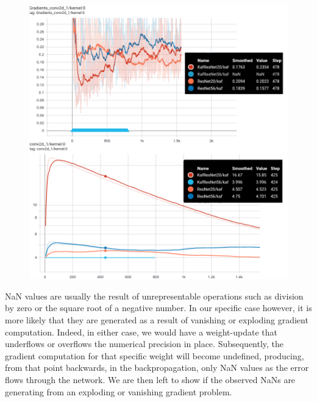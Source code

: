 \documentclass[LaM,binding=0.6cm]{./packages/sapthesis/sapthesis}
\begin{document}
        \begin{figure}[h!]
            \centering
            \includegraphics[scale=0.32]{conv1.png}
            \caption{}
            \label{fig:gradconv1}
        \end{figure}
        NaN values are usually the result of unrepresentable operations such as division by zero or the square root of a negative number. In our specific case however, it is more likely that they are generated as a result 
        of vanishing or exploding gradient computation. Indeed, in either case, we would have a weight-update that underflows or overflows the numerical precision in place. Subsequently, the gradient computation for that 
        specific weight will become undefined, producing, from that point backwards, in the backpropagation, only NaN values as the error flows through the network. We are then left to show if the observed NaNs are generating 
        from an exploding or vanishing gradient problem.
\end{document}
